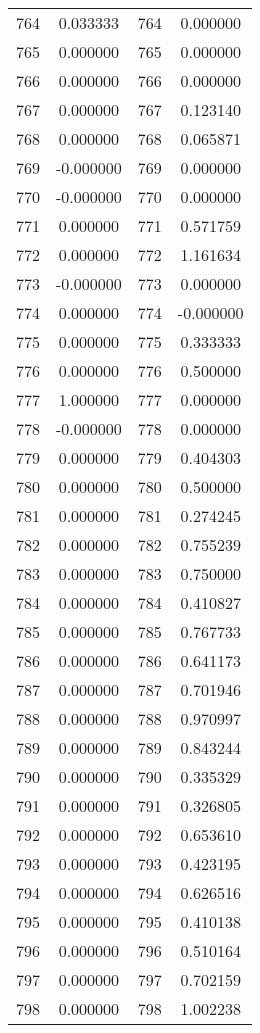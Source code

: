 \documentclass[12pt]{article}
\begin{document}
\begin{longtable}{@{}cccc@{}}
764 & 0.033333 & 764 & 0.000000 \\
765 & 0.000000 & 765 & 0.000000 \\
766 & 0.000000 & 766 & 0.000000 \\
767 & 0.000000 & 767 & 0.123140 \\
768 & 0.000000 & 768 & 0.065871 \\
769 & -0.000000 & 769 & 0.000000 \\
770 & -0.000000 & 770 & 0.000000 \\
771 & 0.000000 & 771 & 0.571759 \\
772 & 0.000000 & 772 & 1.161634 \\
773 & -0.000000 & 773 & 0.000000 \\
774 & 0.000000 & 774 & -0.000000 \\
775 & 0.000000 & 775 & 0.333333 \\
776 & 0.000000 & 776 & 0.500000 \\
777 & 1.000000 & 777 & 0.000000 \\
778 & -0.000000 & 778 & 0.000000 \\
779 & 0.000000 & 779 & 0.404303 \\
780 & 0.000000 & 780 & 0.500000 \\
781 & 0.000000 & 781 & 0.274245 \\
782 & 0.000000 & 782 & 0.755239 \\
783 & 0.000000 & 783 & 0.750000 \\
784 & 0.000000 & 784 & 0.410827 \\
785 & 0.000000 & 785 & 0.767733 \\
786 & 0.000000 & 786 & 0.641173 \\
787 & 0.000000 & 787 & 0.701946 \\
788 & 0.000000 & 788 & 0.970997 \\
789 & 0.000000 & 789 & 0.843244 \\
790 & 0.000000 & 790 & 0.335329 \\
791 & 0.000000 & 791 & 0.326805 \\
792 & 0.000000 & 792 & 0.653610 \\
793 & 0.000000 & 793 & 0.423195 \\
794 & 0.000000 & 794 & 0.626516 \\
795 & 0.000000 & 795 & 0.410138 \\
796 & 0.000000 & 796 & 0.510164 \\
797 & 0.000000 & 797 & 0.702159 \\
798 & 0.000000 & 798 & 1.002238 \\

\end{longtable}
\end{document}
